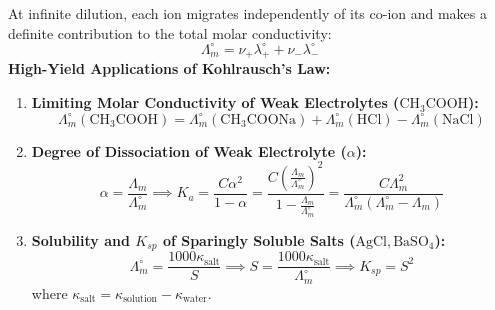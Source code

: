 \documentclass[10pt,a4paper]{article}
\begin{document}
\begin{formulabox}
At infinite dilution, each ion migrates independently of its co-ion and makes a definite contribution to the total molar conductivity:
\begin{equation}
  \Lambda_m^\circ = \nu_+ \lambda_+^\circ + \nu_- \lambda_-^\circ
\end{equation}
\textbf{High-Yield Applications of Kohlrausch's Law:}
\begin{enumerate}
  \item \textbf{Limiting Molar Conductivity of Weak Electrolytes ($\mathrm{CH_3COOH}$):}
  \begin{equation}
    \Lambda_m^\circ(\mathrm{CH_3COOH}) = \Lambda_m^\circ(\mathrm{CH_3COONa}) + \Lambda_m^\circ(\mathrm{HCl}) - \Lambda_m^\circ(\mathrm{NaCl})
  \end{equation}
  \item \textbf{Degree of Dissociation of Weak Electrolyte ($\alpha$):}
  \begin{equation}
    \alpha = \frac{\Lambda_m}{\Lambda_m^\circ} \implies K_a = \frac{C \alpha^2}{1 - \alpha} = \frac{C \left(\frac{\Lambda_m}{\Lambda_m^\circ}\right)^2}{1 - \frac{\Lambda_m}{\Lambda_m^\circ}} = \frac{C \Lambda_m^2}{\Lambda_m^\circ(\Lambda_m^\circ - \Lambda_m)}
  \end{equation}
  \item \textbf{Solubility and $K_{sp}$ of Sparingly Soluble Salts ($\mathrm{AgCl, BaSO_4}$):}
  \begin{equation}
    \Lambda_m^\circ = \frac{1000 \kappa_{\text{salt}}}{S} \implies S = \frac{1000 \kappa_{\text{salt}}}{\Lambda_m^\circ} \implies K_{sp} = S^2
  \end{equation}
  where $\kappa_{\text{salt}} = \kappa_{\text{solution}} - \kappa_{\text{water}}$.
\end{enumerate}
\end{formulabox}
\end{document}

